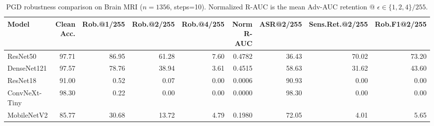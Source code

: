 \begin{table}[htbp]
  \centering
  \caption{PGD robustness comparison on Brain MRI ($n=1356$, steps=10). Normalized R-AUC is the mean Adv-AUC retention @ $\epsilon\in\{1,2,4\}/255$.}
  \label{tab:brain_mri_pgd_robustness_five_models}
  \begin{tabular}{lrrrrrrrr}
    \toprule
    Model & Clean Acc. & Rob.@1/255 & Rob.@2/255 & Rob.@4/255 & Norm R-AUC & ASR@2/255 & Sens.Ret.@2/255 & Rob.F1@2/255 \\
    \midrule
    ResNet50 & 97.71 & 86.95 & 61.28 & 7.60 & 0.4782 & 36.43 & 70.02 & 73.20 \\
    DenseNet121 & 97.57 & 78.76 & 38.94 & 3.61 & 0.4515 & 58.63 & 31.62 & 43.60 \\
    ResNet18 & 91.00 & 0.52 & 0.07 & 0.00 & 0.0006 & 90.93 & 0.00 & 0.00 \\
    ConvNeXt-Tiny & 98.30 & 0.22 & 0.00 & 0.00 & 0.0000 & 98.30 & 0.00 & 0.00 \\
    MobileNetV2 & 85.77 & 30.68 & 13.72 & 4.79 & 0.1980 & 72.05 & 4.01 & 5.65 \\
    \bottomrule
  \end{tabular}
\end{table}

